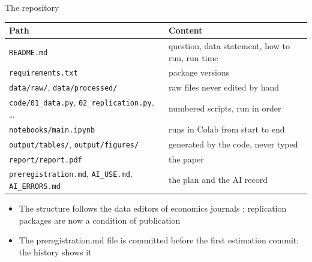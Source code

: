 \begin{frame}{The repository}
\itemsize{\small}
\begin{center}
\scriptsize
\begin{tabular}{>{\raggedright\arraybackslash}p{5.4cm}>{\raggedright\arraybackslash}p{6.8cm}}
\toprule
\textbf{Path} & \textbf{Content} \\
\midrule
\texttt{README.md} & question, data statement, how to run, run time \\
\texttt{requirements.txt} & package versions \\
\texttt{data/raw/}, \texttt{data/processed/} & raw files never edited by hand \\
\texttt{code/01\_data.py}, \texttt{02\_replication.py}, \dots & numbered scripts, run in order \\
\texttt{notebooks/main.ipynb} & runs in Colab from start to end \\
\texttt{output/tables/}, \texttt{output/figures/} & generated by the code, never typed \\
\texttt{report/report.pdf} & the paper \\
\texttt{preregistration.md}, \texttt{AI\_USE.md}, \texttt{AI\_ERRORS.md} & the plan and the AI record \\
\bottomrule
\end{tabular}
\end{center}

\vspace{2mm}
\begin{itemize}
    \item The structure follows the data editors of economics journals ; replication packages are now a condition of publication 
    \item The preregistration.md file is committed before the first estimation commit: the history shows it
\end{itemize}
\end{frame}

